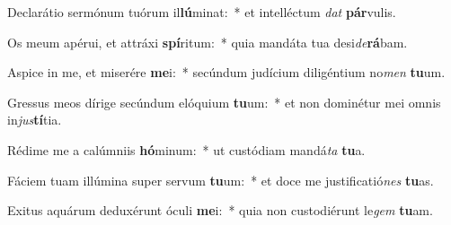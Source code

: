 \item Declarátio sermónum tuórum il\textbf{lú}minat:~* et intelléctum \textit{dat} \textbf{pár}vulis.
\item Os meum apérui, et attráxi \textbf{spí}ritum:~* quia mandáta tua desi\textit{de}\textbf{rá}bam.
\item Aspice in me, et miserére \textbf{me}i:~* secúndum judícium diligéntium no\textit{men} \textbf{tu}um.
\item Gressus meos dírige secúndum elóquium \textbf{tu}um:~* et non dominétur mei omnis in\textit{jus}\textbf{tí}tia.
\item Rédime me a calúmniis \textbf{hó}minum:~* ut custódiam mandá\textit{ta} \textbf{tu}a.
\item Fáciem tuam illúmina super servum \textbf{tu}um:~* et doce me justificatió\textit{nes} \textbf{tu}as.
\item Exitus aquárum deduxérunt óculi \textbf{me}i:~* quia non custodiérunt le\textit{gem} \textbf{tu}am.
